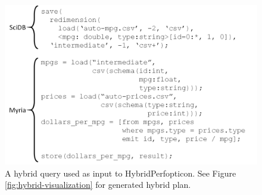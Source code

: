 \documentclass{chi2009}
\begin{document}
\begin{figure}[h]
\begin{center}
\includegraphics[scale=0.17]{visualization-query.png}
\end{center}
\caption{A hybrid query used as input to HybridPerfopticon.  See Figure \ref{fig:hybrid-visualization} for generated hybrid plan.}
\label{fig:hybrid-plan}
\end{figure}
\end{document}

